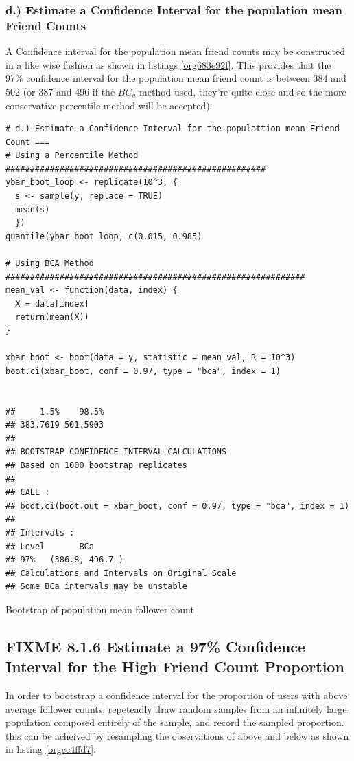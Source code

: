 \documentclass[11pt]{article}
\begin{document}
\subsubsection{d.) Estimate a Confidence Interval for the population mean Friend Counts}
\label{sec:org3b6fc56}
A Confidence interval for the population mean friend counts may be constructed in a like wise fashion as shown in listings \ref{org683e92f}. This provides that the 97\% confidence interval for the population mean friend count is between 384 and 502 (or 387 and 496 if the \(BC_{a}\) method used, they're quite close and so the more conservative percentile method will be accepted).

\begin{listing}[htbp]
\begin{verbatim}
# d.) Estimate a Confidence Interval for the populattion mean Friend Count ===
# Using a Percentile Method #####################################################
ybar_boot_loop <- replicate(10^3, {
  s <- sample(y, replace = TRUE)
  mean(s)
  })
quantile(ybar_boot_loop, c(0.015, 0.985)

# Using BCA Method #############################################################
mean_val <- function(data, index) {
  X = data[index]
  return(mean(X))
}

xbar_boot <- boot(data = y, statistic = mean_val, R = 10^3)
boot.ci(xbar_boot, conf = 0.97, type = "bca", index = 1)


##     1.5%    98.5%
## 383.7619 501.5903
##
## BOOTSTRAP CONFIDENCE INTERVAL CALCULATIONS
## Based on 1000 bootstrap replicates
##
## CALL :
## boot.ci(boot.out = xbar_boot, conf = 0.97, type = "bca", index = 1)
##
## Intervals :
## Level       BCa
## 97%   (386.8, 496.7 )
## Calculations and Intervals on Original Scale
## Some BCa intervals may be unstable
\end{verbatim}
\caption{\label{org683e92f}Bootstrap of population mean follower count}
\end{listing}

\subsection{{\bfseries\sffamily FIXME} 8.1.6 Estimate a 97\% Confidence Interval for the High Friend Count Proportion}
\label{sec:org4f37de2}
In order to bootstrap a confidence interval for the proportion of users with
above average follower counts, repeteadly draw random samples from an infinitely
large population composed entirely of the sample, and record the sampled
proportion. this can be acheived by resampling the observations of above and
below as shown in listing \ref{orgcc4ffd7}.
\end{document}

